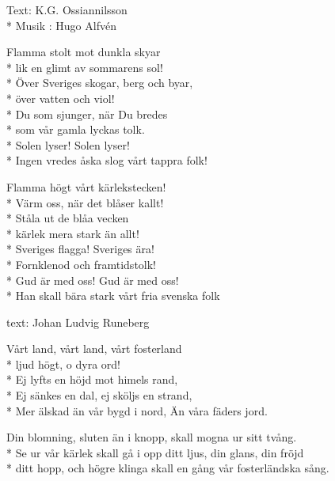 \begin{SongText}
    \begin{SongInfo}
        Text: K.G. Ossiannilsson\\*%
        Musik : Hugo Alfvén
    \end{SongInfo}
    \begin{SongVerse}
        Flamma stolt mot dunkla skyar\\*%
        lik en glimt av sommarens sol!\\*%
        Över Sveriges skogar, berg och byar,\\*%
        över vatten och viol!\\*%
        Du som sjunger, när Du bredes\\*%
        som vår gamla lyckas tolk.\\*%
        Solen lyser! Solen lyser!\\*%
        Ingen vredes åska slog vårt tappra folk!
    \end{SongVerse}
    \begin{SongVerse}
        Flamma högt vårt kärlekstecken!\\*%
        Värm oss, när det blåser kallt!\\*%
        Ståla ut de blåa vecken\\*%
        kärlek mera stark än allt!\\*%
        Sveriges flagga! Sveriges ära!\\*%
        Fornklenod och framtidstolk!\\*%
        Gud är med oss! Gud är med oss!\\*%
        Han skall bära stark vårt fria svenska folk
    \end{SongVerse}
\end{SongText}

\begin{SongText}
    \begin{SongInfo}
        text: Johan Ludvig Runeberg
    \end{SongInfo}
    \begin{SongVerse}
        Vårt land, vårt land, vårt fosterland\\*%
        ljud högt, o dyra ord!\\*%
        Ej lyfts en höjd mot himels rand,\\*%
        Ej sänkes en dal, ej sköljs en strand,\\*%
        Mer älskad än vår bygd i nord, Än våra fäders jord.
    \end{SongVerse}
    \begin{SongVerse}
        Din blomning, sluten än i knopp, skall mogna ur sitt tvång.\\*%
        Se ur vår kärlek skall gå i opp ditt ljus, din glans, din fröjd\\*%
        ditt hopp, och högre klinga skall en gång vår fosterländska sång.
    \end{SongVerse}
\end{SongText}

